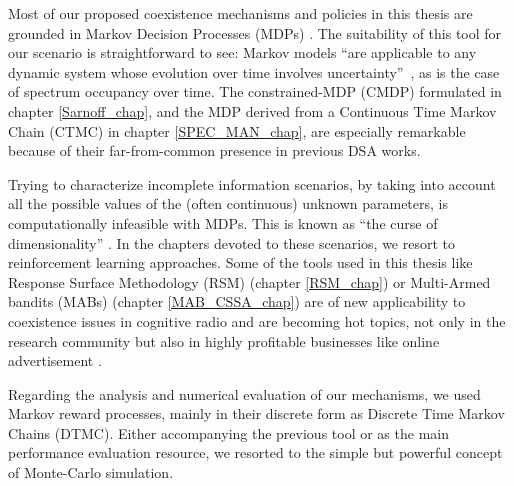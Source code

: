 Most of our proposed coexistence mechanisms and policies in this thesis are grounded in Markov Decision Processes (MDPs) \cite{ref:Puterman2005}. 
The suitability of this tool for our scenario is straightforward to see: Markov models \enquote{are applicable to any dynamic system whose evolution over time involves uncertainty} \cite{ref:Bertsekas}, as is the case of spectrum occupancy over time. 
The constrained-MDP (CMDP) formulated in chapter \ref{Sarnoff_chap}, and the MDP derived from a Continuous Time Markov Chain (CTMC) in chapter \ref{SPEC_MAN_chap}, are especially remarkable because of their far-from-common presence in previous DSA works. 

Trying to characterize incomplete information scenarios, by taking into account all the possible values of the (often continuous) unknown parameters, is computationally infeasible with MDPs. 
This is known as \enquote{the curse of dimensionality} \cite{ref:Powell}. 
In the chapters devoted to these scenarios, we resort to reinforcement learning approaches. Some of the tools used in this thesis like Response Surface Methodology (RSM) (chapter \ref{RSM_chap}) or Multi-Armed bandits (MABs) (chapter \ref{MAB_CSSA_chap}) are of new applicability to coexistence issues in cognitive radio and are becoming hot topics, not only in the research community \cite{ref:Bkassiny2013} but also in highly profitable businesses like online advertisement \cite{ref:White2012}. 

Regarding the analysis and numerical evaluation of our mechanisms, we used Markov reward processes, mainly in their discrete form as Discrete Time Markov Chains (DTMC). Either accompanying the previous tool or as the main performance evaluation resource, we resorted to the simple but powerful concept of Monte-Carlo simulation.

